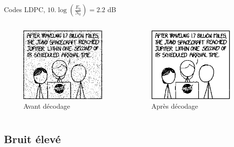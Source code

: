 \documentclass[11pt]{beamer}
\begin{document}
\begin{frame}{Codes LDPC, $10.\log(\frac{E_b}{N_0}) = 2.2$ dB}
	\begin{columns}
		\begin{column}{.5\textwidth}
			\begin{figure}
				\includegraphics[scale=0.6]{ldpc_basic_noisy_60}\\
				Avant d\'ecodage
			\end{figure}
		\end{column}
		\begin{column}{.5\textwidth}
			\begin{figure}
				\includegraphics[scale=0.6]{ldpc_basic_decoded_60}\\
				Apr\`es d\'ecodage
			\end{figure}
		\end{column}
	\end{columns}
\end{frame}


\subsection{Bruit \'elev\'e}
\end{document}

